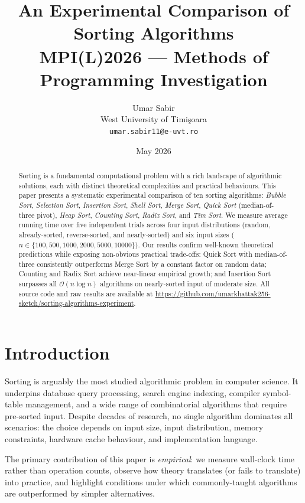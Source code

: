 \documentclass[11pt,a4paper]{article}
\title{\textbf{An Experimental Comparison of Sorting Algorithms}\\[0.4em]
\large MPI(L)2026 — Methods of Programming Investigation}
\author{%
  Umar Sabir\\
  \small West University of Timi\c{s}oara\\
  \small \texttt{umar.sabir11@e-uvt.ro}
}
\date{May 2026}
\begin{document}
\maketitle

\begin{abstract}
Sorting is a fundamental computational problem with a rich landscape of algorithmic
solutions, each with distinct theoretical complexities and practical behaviours.
This paper presents a systematic experimental comparison of ten sorting algorithms:
\emph{Bubble Sort}, \emph{Selection Sort}, \emph{Insertion Sort}, \emph{Shell Sort},
\emph{Merge Sort}, \emph{Quick Sort} (median-of-three pivot), \emph{Heap Sort},
\emph{Counting Sort}, \emph{Radix Sort}, and \emph{Tim Sort}.
We measure average running time over five independent trials across four input
distributions (random, already-sorted, reverse-sorted, and nearly-sorted) and six
input sizes ($n \in \{100, 500, 1000, 2000, 5000, 10000\}$).
Our results confirm well-known theoretical predictions while exposing non-obvious
practical trade-offs: Quick Sort with median-of-three consistently outperforms Merge
Sort by a constant factor on random data; Counting and Radix Sort achieve near-linear
empirical growth; and Insertion Sort surpasses all $\mathcal{O}(n\log n)$ algorithms
on nearly-sorted input of moderate size.
All source code and raw results are available at
\url{https://github.com/umarkhattak256-sketch/sorting-algorithms-experiment}.
\end{abstract}

\tableofcontents
\newpage

\section{Introduction}

Sorting is arguably the most studied algorithmic problem in computer science.
It underpins database query processing, search engine indexing, compiler symbol-table
management, and a wide range of combinatorial algorithms that require pre-sorted input.
Despite decades of research, no single algorithm dominates all scenarios: the choice
depends on input size, input distribution, memory constraints, hardware cache
behaviour, and implementation language.

The primary contribution of this paper is \emph{empirical}: we measure wall-clock time
rather than operation counts, observe how theory translates (or fails to translate)
into practice, and highlight conditions under which commonly-taught algorithms
are outperformed by simpler alternatives.
\end{document}
